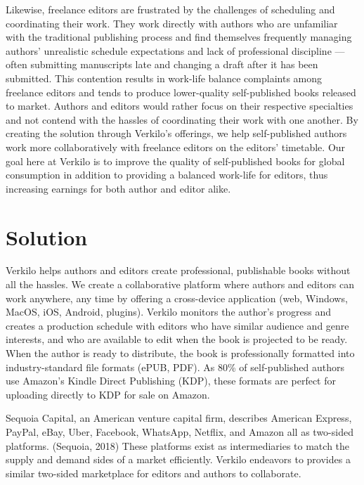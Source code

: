 \documentclass[11pt,openany]{book}
\begin{document}
Likewise, freelance editors are frustrated by the challenges of
scheduling and coordinating their work. They work directly with authors
who are unfamiliar with the traditional publishing process and find
themselves frequently managing authors' unrealistic schedule
expectations and lack of professional discipline ---often submitting
manuscripts late and changing a draft after it has been submitted. This
contention results in work-life balance complaints among freelance
editors and tends to produce lower-quality self-published books released
to market. Authors and editors would rather focus on their respective
specialties and not contend with the hassles of coordinating their work
with one another. By creating the solution through Verkilo's offerings,
we help self-published authors work more collaboratively with freelance
editors on the editors' timetable. Our goal here at Verkilo is to
improve the quality of self-published books for global consumption in
addition to providing a balanced work-life for editors, thus increasing
earnings for both author and editor alike.

\hypertarget{solution}{%
\section{Solution}\label{solution}}

Verkilo helps authors and editors create professional, publishable books
without all the hassles. We create a collaborative platform where
authors and editors can work anywhere, any time by offering a
cross-device application (web, Windows, MacOS, iOS, Android, plugins).
Verkilo monitors the author's progress and creates a production schedule
with editors who have similar audience and genre interests, and who are
available to edit when the book is projected to be ready. When the
author is ready to distribute, the book is professionally formatted into
industry-standard file formats (ePUB, PDF). As 80\% of self-published
authors use Amazon's Kindle Direct Publishing (KDP), these formats are
perfect for uploading directly to KDP for sale on Amazon.

Sequoia Capital, an American venture capital firm, describes American
Express, PayPal, eBay, Uber, Facebook, WhatsApp, Netflix, and Amazon all
as two-sided platforms. (Sequoia, 2018) These platforms exist as
intermediaries to match the supply and demand sides of a market
efficiently. Verkilo endeavors to provides a similar two-sided
marketplace for editors and authors to collaborate.
\end{document}
